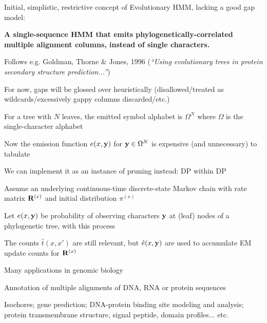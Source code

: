 \documentclass{beamer}
\begin{document}
\begin{frame}{}
\itemb
\item Initial, simplistic, restrictive concept of Evolutionary HMM, lacking a good gap model:
 \itemb
 \item {\bf A single-sequence HMM that emits phylogenetically-correlated multiple alignment columns, instead of single characters.}
 \item Follows e.g. Goldman, Thorne \& Jones, 1996 ({\em ``Using evolutionary trees in protein secondary structure prediction...''})
 \item For now, gaps will be glossed over heuristically (disallowed/treated as wildcards/excessively gappy columns discarded/etc.)
 \iteme
\item For a tree with $N$ leaves, the emitted symbol alphabet is $\Omega^N$ where $\Omega$ is the single-character alphabet
\iteme
\end{frame}

\begin{frame}
\itemb
\item Now the emission function $e(x,{\bf y)}$ for ${\bf y} \in \Omega^N$ is expensive (and unnecessary) to tabulate
 \itemb
 \item We can implement it as an instance of pruning instead: DP within DP
 \item Assume an underlying continuous-time discrete-state Markov chain with rate matrix ${\bf R}^{(x)}$ and initial distribution $\pi^{(x)}$
 \item Let $e(x,{\bf y})$ be probability of observing characters ${\bf y}$ at (leaf) nodes of a phylogenetic tree, with this process
 \iteme
\item The counts $\hat{t}(x,x')$ are still relevant, but $\hat{e}(x,{\bf y})$ are used to accumulate EM update counts for ${\bf R}^{(x)}$
\iteme
\end{frame}

\begin{frame}{}
\itemb
\item Many applications in genomic biology
 \itemb
 \item Annotation of multiple alignments of DNA, RNA or protein sequences
 \item Isochores; gene prediction; DNA-protein binding site modeling and analysis; protein transmembrane structure, signal peptide, domain profiles... etc.
 \iteme
\iteme
\end{frame}{}
\end{document}
